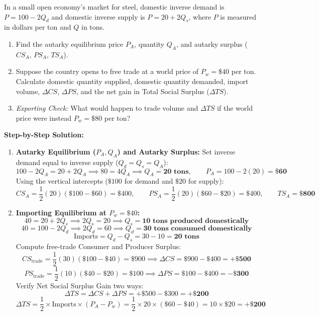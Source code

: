 \documentclass[11pt,letterpaper]{article}
\begin{document}
\begin{tcolorbox}[colback=LightSlate,colframe=CourseBlue,title=\textbf{Work It Out 14.1: Free Trade Surplus in a Small Steel Market}]
In a small open economy's market for steel, domestic inverse demand is $P = 100 - 2Q_d$ and domestic inverse supply is $P = 20 + 2Q_s$, where $P$ is measured in dollars per ton and $Q$ in tons.
\begin{enumerate}
    \item Find the autarky equilibrium price $P_A$, quantity $Q_A$, and autarky surplus ($CS_A$, $PS_A$, $TS_A$).
    \item Suppose the country opens to free trade at a world price of $P_w = \$40$ per ton. Calculate domestic quantity supplied, domestic quantity demanded, import volume, $\Delta CS$, $\Delta PS$, and the net gain in Total Social Surplus ($\Delta TS$).
    \item \emph{Exporting Check:} What would happen to trade volume and $\Delta TS$ if the world price were instead $P_w = \$80$ per ton?
\end{enumerate}

\medskip
\noindent\textbf{Step-by-Step Solution:}
\begin{enumerate}
    \item \textbf{Autarky Equilibrium ($P_A, Q_A$) and Autarky Surplus:}
    Set inverse demand equal to inverse supply ($Q_d = Q_s = Q_A$):
    \[
    100 - 2Q_A = 20 + 2Q_A \implies 80 = 4Q_A \implies Q_A = \mathbf{20\text{ tons}}, \qquad P_A = 100 - 2(20) = \mathbf{\$60}
    \]
    Using the vertical intercepts ($\$100$ for demand and $\$20$ for supply):
    \[
    CS_A = \frac{1}{2}(20)(\$100 - \$60) = \$400, \qquad PS_A = \frac{1}{2}(20)(\$60 - \$20) = \$400, \qquad TS_A = \mathbf{\$800}
    \]

    \item \textbf{Importing Equilibrium at $P_w = \$40$:}
    \[
    40 = 20 + 2Q_s \implies 2Q_s = 20 \implies Q_s = \mathbf{10\text{ tons produced domestically}}
    \]
    \[
    40 = 100 - 2Q_d \implies 2Q_d = 60 \implies Q_d = \mathbf{30\text{ tons consumed domestically}}
    \]
    \[
    \text{Imports} = Q_d - Q_s = 30 - 10 = \mathbf{20\text{ tons}}
    \]
    Compute free-trade Consumer and Producer Surplus:
    \[
    CS_{\text{trade}} = \frac{1}{2}(30)(\$100 - \$40) = \$900 \implies \Delta CS = \$900 - \$400 = \mathbf{+\$500}
    \]
    \[
    PS_{\text{trade}} = \frac{1}{2}(10)(\$40 - \$20) = \$100 \implies \Delta PS = \$100 - \$400 = \mathbf{-\$300}
    \]
    Verify Net Social Surplus Gain two ways:
    \[
    \Delta TS = \Delta CS + \Delta PS = +\$500 - \$300 = \mathbf{+\$200}
    \]
    \[
    \Delta TS = \frac{1}{2} \times \text{Imports} \times (P_A - P_w) = \frac{1}{2} \times 20 \times (\$60 - \$40) = 10 \times \$20 = \mathbf{+\$200}
    \]


\end{enumerate}
\end{tcolorbox}
\end{document}

